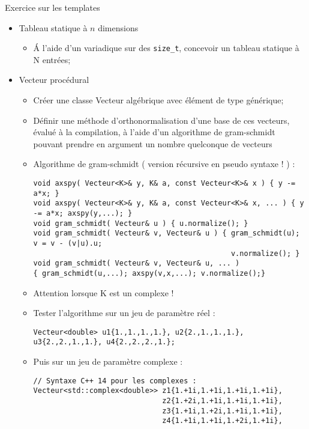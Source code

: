 \documentclass[handout,10pt]{beamer}
\begin{document}
\begin{frame}[fragile]{Exercice sur les templates}
\tiny
\begin{itemize}
\item Tableau statique à $n$ dimensions
\begin{itemize}
\item \'A l'aide d'un variadique sur des \lstinline$size_t$, concevoir un tableau statique à N entrées;
\end{itemize}
\item Vecteur procédural
\begin{itemize}
 \item Créer une classe Vecteur algébrique avec élément de type générique;
 \item Définir une méthode d'orthonormalisation d'une base de ces vecteurs, évalué à la compilation, à l'aide
 d'un algorithme de gram-schmidt pouvant prendre en argument un nombre quelconque de vecteurs
 \item Algorithme de gram-schmidt ( version récursive en pseudo syntaxe ! ) :
\begin{lstlisting}
void axspy( Vecteur<K>& y, K& a, const Vecteur<K>& x ) { y -= a*x; }
void axspy( Vecteur<K>& y, K& a, const Vecteur<K>& x, ... ) { y -= a*x; axspy(y,...); }
void gram_schmidt( Vecteur& u ) { u.normalize(); }
void gram_schmidt( Vecteur& v, Vecteur& u ) { gram_schmidt(u); v = v - (v|u).u; 
                                              v.normalize(); }
void gram_schmidt( Vecteur& v, Vecteur& u, ... )
{ gram_schmidt(u,...); axspy(v,x,...); v.normalize();}
\end{lstlisting}
\item Attention lorsque K est un complexe !
\item Tester l'algorithme sur un jeu de paramètre réel :
\begin{lstlisting}
Vecteur<double> u1{1.,1.,1.,1.}, u2{2.,1.,1.,1.}, u3{2.,2.,1.,1.}, u4{2.,2.,2.,1.};
\end{lstlisting}
\item Puis sur un jeu de paramètre complexe :
\begin{lstlisting}
// Syntaxe C++ 14 pour les complexes :
Vecteur<std::complex<double>> z1{1.+1i,1.+1i,1.+1i,1.+1i},
                              z2{1.+2i,1.+1i,1.+1i,1.+1i},
                              z3{1.+1i,1.+2i,1.+1i,1.+1i},
                              z4{1.+1i,1.+1i,1.+2i,1.+1i},
\end{lstlisting}
\end{itemize}
\end{itemize}
\end{frame}
\end{document}
